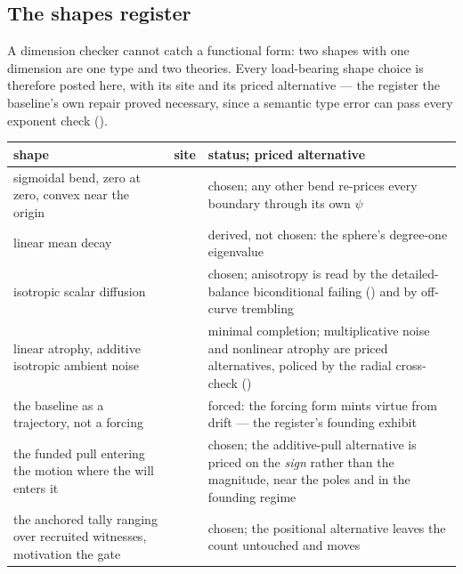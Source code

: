 \documentclass[../main]{subfiles}
\begin{document}
\subsection{The shapes register}
\label{subsec:ledger:shapes}
A dimension checker cannot catch a functional form: two shapes with one dimension are
one type and two theories. Every load-bearing shape choice is therefore posted here,
with its site and its priced alternative --- the register the baseline's own repair
proved necessary, since a semantic type error can pass every exponent check
().

\begin{table}[htbp]
  \centering
  \begin{tabularx}{\textwidth}{@{} >{\hsize}L l >{\hsize}L @{}}
    \toprule
    \textbf{shape} & \textbf{site} & \textbf{status; priced alternative} \\
    \midrule
    sigmoidal bend, zero at zero, convex near the origin & 
      & chosen; any other bend re-prices every boundary through its own
        $\psi$ \\
    \addlinespace
    linear mean decay & 
      & derived, not chosen: the sphere's degree-one eigenvalue \\
    \addlinespace
    isotropic scalar diffusion & 
      & chosen; anisotropy is read by the detailed-balance biconditional
        failing () and by off-curve trembling \\
    \addlinespace
    linear atrophy, additive isotropic ambient noise & 
      & minimal completion; multiplicative noise and nonlinear atrophy are
        priced alternatives, policed by the radial cross-check
        () \\
    \addlinespace
    the baseline as a trajectory, not a forcing & 
      & forced: the forcing form mints virtue from drift --- the register's
        founding exhibit \\
    \addlinespace
    the funded pull entering the motion where the will enters it
      & 
      & chosen; the additive-pull alternative is priced on the \emph{sign}
        rather than the magnitude, near the poles and in the founding regime \\
    \addlinespace
    the anchored tally ranging over recruited witnesses, motivation the gate
      & 
      & chosen; the positional alternative leaves the count untouched and moves

\end{tabularx}
\end{table}
\end{document}
